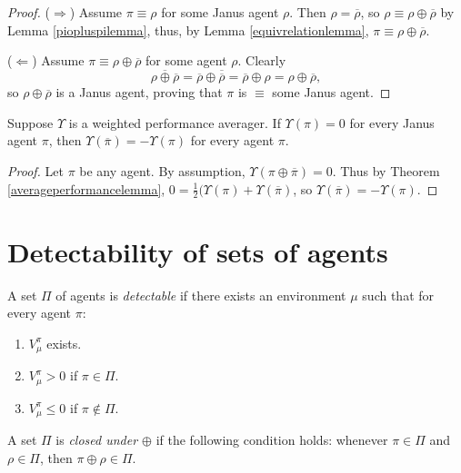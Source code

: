\documentclass[runningheads]{llncs}
\begin{document}
\begin{proof}
    ($\Rightarrow$)
    Assume $\pi\equiv\rho$ for some Janus agent $\rho$.
    Then $\rho=\overline{\rho}$, so $\rho\equiv \rho\oplus\overline{\rho}$ by
    Lemma \ref{piopluspilemma}, thus, by Lemma \ref{equivrelationlemma},
    $\pi\equiv\rho\oplus\overline{\rho}$.

    ($\Leftarrow$)
    Assume $\pi\equiv\rho\oplus\overline{\rho}$ for some agent $\rho$.
    Clearly
    \[
        \overline{\rho\oplus\overline{\rho}}
        =
        \overline{\rho}\oplus\overline{\overline{\rho}}
        =
        \overline{\rho}\oplus\rho
        =
        \rho\oplus\overline{\rho},
    \]
    so $\rho\oplus\overline{\rho}$ is a Janus agent, proving that
    $\pi$ is $\equiv$ some Janus agent.
\end{proof}

\begin{theorem}
    Suppose $\Upsilon$ is a weighted performance averager.
    If $\Upsilon(\pi)=0$ for every Janus agent $\pi$,
    then $\Upsilon(\overline{\pi})=-\Upsilon(\pi)$
    for every agent $\pi$.
\end{theorem}

\begin{proof}
    Let $\pi$ be any agent.
    By assumption, $\Upsilon(\pi\oplus\overline{\pi})=0$.
    Thus by Theorem \ref{averageperformancelemma},
    $0=\frac12(\Upsilon(\pi)+\Upsilon(\overline{\pi})$,
    so $\Upsilon(\overline{\pi})=-\Upsilon(\pi)$.
\end{proof}


\section{Detectability of sets of agents}

\begin{definition}
\label{incentivizabilitydefn}
    A set $\Pi$ of agents is \emph{detectable} if there exists
    an environment $\mu$ such that for every agent $\pi$:
    \begin{enumerate}
        \item
        $V^\pi_\mu$ exists.
        \item
        $V^\pi_\mu>0$ if $\pi\in\Pi$.
        \item
        $V^\pi_\mu\leq 0$ if $\pi\not\in\Pi$.
    \end{enumerate}
\end{definition}

\begin{definition}
    A set $\Pi$ is \emph{closed under $\oplus$} if the following
    condition holds: whenever $\pi\in\Pi$ and $\rho\in\Pi$,
    then $\pi\oplus\rho\in\Pi$.
\end{definition}
\end{document}
